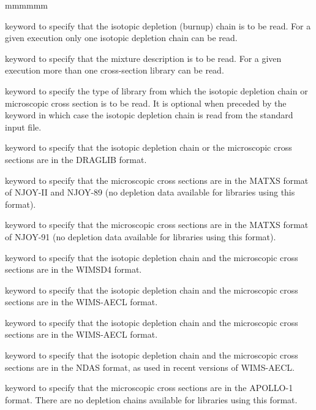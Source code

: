 \begin{ListeDeDescription}{mmmmmm}
\item[\moc{DEPL}] keyword to specify that the isotopic depletion (burnup)
chain is to be read. For a given  execution only one isotopic
depletion chain can be read. 

\item[\moc{MIXS}] keyword to specify that the mixture description is to be
read. For a given  execution more than one cross-section library can
be read. 

\item[\moc{LIB:}] keyword to specify the type of library from which the
isotopic depletion chain or microscopic cross section is to be read. It is
optional when preceded by the keyword  in which case the isotopic
depletion chain is read from the standard input file. 

\item[\moc{DRAGON}] keyword to specify that the isotopic depletion chain or
the microscopic cross sections are in the DRAGLIB format.

\item[\moc{MATXS}] keyword to specify that the microscopic cross sections are
in the MATXS format of NJOY-II and NJOY-89 (no depletion data available for
libraries using this format).

\item[\moc{MATXS2}] keyword to specify that the microscopic cross sections are
in the MATXS format of NJOY-91 (no depletion data available for libraries using
this format).

\item[\moc{WIMSD4}] keyword to specify that the isotopic depletion chain and the
microscopic cross sections are in the WIMSD4 format.

\item[\moc{WIMS}] keyword to specify that the isotopic depletion chain and the
microscopic cross sections are in the WIMS-AECL format.

\item[\moc{WIMSAECL}] keyword to specify that the isotopic depletion chain and the
microscopic cross sections are in the WIMS-AECL format.

\item[\moc{NDAS}] keyword to specify that the isotopic depletion chain and the
microscopic cross sections are in the NDAS format, as used in recent versions of WIMS-AECL.

\item[\moc{APLIB1}] keyword to specify that the microscopic cross sections are
in the APOLLO-1 format. There are no depletion chains available for libraries using this
format.


\end{ListeDeDescription}
